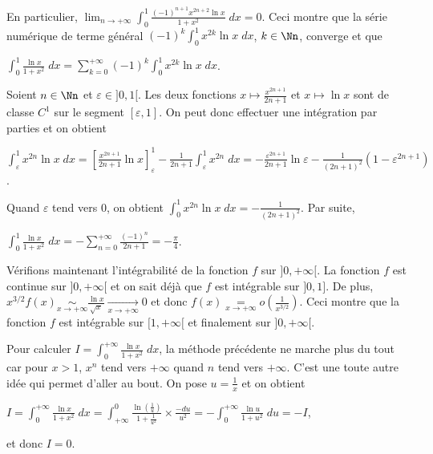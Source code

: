 {{En particulier, $\lim_{n \rightarrow +\infty}\int_{0}^{1}\frac{(-1)^{n+1}x^{2n+2}\ln x}{1+x^2}\;dx=0$. Ceci montre que la série numérique de terme général $(-1)^k\int_{0}^{1}x^{2k}\ln x\;dx$, $k\in\Nn$, converge et que

\begin{center}
$\int_{0}^{1}\frac{\ln x}{1+x^2}\;dx=\sum_{k=0}^{+\infty}(-1)^k\int_{0}^{1}x^{2k}\ln x\;dx$.
\end{center}

Soient $n\in\Nn$ et $\varepsilon\in]0,1[$. Les deux fonctions $x\mapsto\frac{x^{2n+1}}{2n+1}$ et $x\mapsto\ln x$ sont de classe $C^1$ sur le segment $[\varepsilon,1]$. On peut donc effectuer une intégration par parties et on obtient

\begin{center}
$\int_{\varepsilon}^{1}x^{2n}\ln x\;dx=\left[\frac{x^{2n+1}}{2n+1}\ln x\right]_\varepsilon^1-\frac{1}{2n+1}\int_{\varepsilon}^{1}x^{2n}\;dx=-\frac{\varepsilon^{2n+1}}{2n+1}\ln \varepsilon-\frac{1}{(2n+1)^2}(1-\varepsilon^{2n+1})$.
\end{center}

Quand $\varepsilon$ tend vers $0$, on obtient $\int_{0}^{1}x^{2n}\ln x\;dx=-\frac{1}{(2n+1)^2}$. Par suite,

\begin{center}
$\int_{0}^{1}\frac{\ln x}{1+x^2}\;dx=-\sum_{n=0}^{+\infty}\frac{(-1)^n}{2n+1}=-\frac{\pi}{4}$.
\end{center}

Vérifions maintenant l'intégrabilité de la fonction $f$ sur $]0,+\infty[$. La fonction $f$ est continue sur $]0,+\infty[$ et on sait déjà que $f$ est intégrable sur $]0,1]$. De plus, $x^{3/2}f(x)\underset{x\rightarrow+\infty}{\sim}\frac{\ln x}{\sqrt{x}}\underset{x\rightarrow+\infty}{\rightarrow}0$ et donc $f(x)\underset{x\rightarrow+\infty}{=}o\left(\frac{1}{x^{3/2}}\right)$. Ceci montre que la fonction $f$ est intégrable sur $[1,+\infty[$ et finalement sur $]0,+\infty[$.

Pour calculer $I=\int_{0}^{+\infty}\frac{\ln x}{1+x^2}\;dx$, la méthode précédente ne marche plus du tout  car pour $x>1$, $x^{n}$ tend vers $+\infty$ quand $n$ tend vers $+\infty$. C'est une toute autre idée qui permet d'aller au bout. On pose $u=\frac{1}{x}$ et on obtient

\begin{center}
$I=\int_{0}^{+\infty}\frac{\ln x}{1+x^2}\;dx=\int_{+\infty}^{0}\frac{\ln\left(\frac{1}{u}\right)}{1+\frac{1}{u^2}}\times\frac{-du}{u^2}=-\int_{0}^{+\infty}\frac{\ln u}{1+u^2}\;du=-I$,
\end{center}

et donc $I=0$.

\begin{center}
\end{center}
}
}
